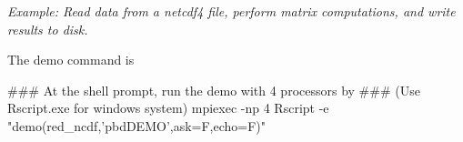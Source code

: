 \emph{Example:  Read data from a netcdf4 file, perform matrix computations, and write results to disk.}

The demo command is
\begin{Command}
### At the shell prompt, run the demo with 4 processors by
### (Use Rscript.exe for windows system)
mpiexec -np 4 Rscript -e "demo(red_ncdf,'pbdDEMO',ask=F,echo=F)"
\end{Command}



\begin{center}
{\Huge \color{red}{WORK IN PROGRESS}} 
\end{center}









